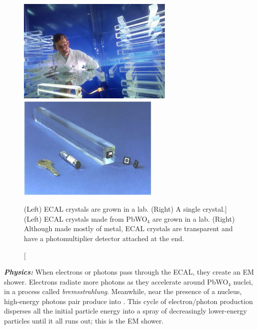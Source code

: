 \begin{figure}[pbth]
    \centering
    \includegraphics[height=5cm,keepaspectratio]{figures/cms/ecal/ECAL_crystals_fancy_lab.jpg}
    \includegraphics[height=5cm,keepaspectratio]{figures/cms/ecal/ECAL_crystal_sizecomparison.jpg}
    \caption
        [(Left) ECAL crystals are grown in a lab. (Right) A single crystal.]
        {
        (Left) ECAL crystals made from PbWO$_4$ are grown in a lab.
        (Right) Although made mostly of metal, ECAL crystals are transparent and have a photomultiplier detector attached at the end.
        } 
    \label{fig:ecal_crystals}
\end{figure}

\textit{\textbf{Physics:}}
When electrons or photons pass through the ECAL, they create an EM shower.
Electrons radiate more photons as they accelerate around PbWO$_4$ nuclei, in a process called \emph{bremsstrahlung}.
Meanwhile, near the presence of a nucleus, high-energy photons pair produce into \eepm.
This cycle of electron/photon production disperses all the initial particle energy into a spray of decreasingly lower-energy particles until it all runs out; this is the EM shower.

